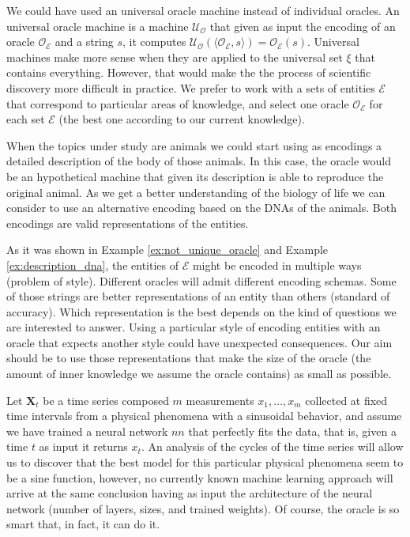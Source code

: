 We could have used an universal oracle machine instead of individual oracles. An universal oracle machine is a machine $\mathcal{U}_\mathcal{O}$ that given as input the encoding of an oracle $\mathcal{O}_\mathcal{E}$ and a string $s$, it computes $\mathcal{U}_\mathcal{O} \left( \langle \mathcal{O}_\mathcal{E}, s \rangle \right) = \mathcal{O}_\mathcal{E} \left( s \right)$. Universal machines make more sense when they are applied to the universal set $\xi$ that contains everything. However, that would make the the process of scientific discovery more difficult in practice. We prefer to work with a sets of entities $\mathcal{E}$ that correspond to particular areas of knowledge, and select one oracle $\mathcal{O}_\mathcal{E}$ for each set $\mathcal{E}$ (the best one according to our current knowledge).

\begin{example}
\label{ex:description_dna}
When the topics under study are animals we could start using as encodings a detailed description of the body of those animals. In this case, the oracle would be an hypothetical machine that given its description is able to reproduce the original animal. As we get a better understanding of the biology of life we can consider to use an alternative encoding based on the DNAs of the animals. Both encodings are valid representations of the entities.
\end{example}

As it was shown in Example \ref{ex:not_unique_oracle} and Example \ref{ex:description_dna}, the entities of $\mathcal{E}$ might be encoded in multiple ways (problem of style). Different oracles will admit different encoding schemas. Some of those strings are better representations of an entity than others (standard of accuracy). Which representation is the best depends on the kind of questions we are interested to answer. Using a particular style of encoding entities with an oracle that expects another style could have unexpected consequences.  Our aim should be to use those representations that make the size of the oracle (the amount of inner knowledge we assume the oracle contains) as small as possible.

\begin{example}
Let $\mathbf{X}_t$ be a time series composed $m$ measurements $x_1, \ldots, x_m$ collected at fixed time intervals from a physical phenomena with a sinusoidal behavior, and assume we have trained a neural network $nn$ that perfectly fits the data, that is, given a time $t$ as input it returns $x_t$. An analysis of the cycles of the time series will allow us to discover that the best model for this particular physical phenomena seem to be a sine function, however, no currently known machine learning approach will arrive at the same conclusion having as input the architecture of the neural network (number of layers, sizes, and trained weights). Of course, the oracle is so smart that, in fact, it can do it.
\end{example}

